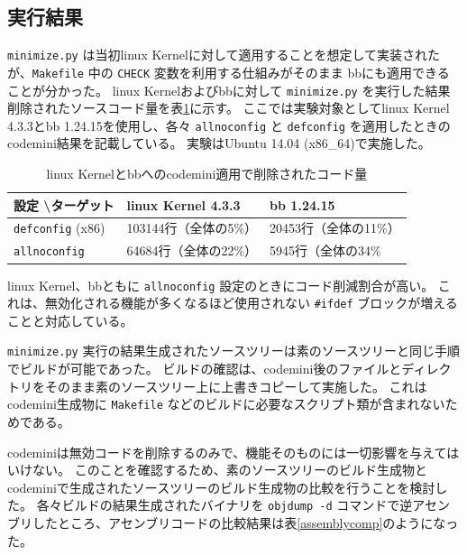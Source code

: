 \subsection{実行結果}
\verb|minimize.py| は当初\acrshort{linux} Kernelに対して適用することを想定して実装されたが、\verb|Makefile| 中の \verb|CHECK| 変数を利用する仕組みがそのまま
\acrshort{bb}にも適用できることが分かった。
\acrshort{linux} Kernelおよび\acrshort{bb}に対して \verb|minimize.py| を実行した結果削除されたソースコード量を表\ref{ministats}に示す。
ここでは実験対象として\acrshort{linux} Kernel 4.3.3と\acrshort{bb} 1.24.15を使用し、各々 \verb|allnoconfig| と \verb|defconfig| を適用したときの
\acrshort{codemini}結果を記載している。
実験はUbuntu 14.04 (x86\_64)で実施した。
\begin{table}[H]
  \caption{\acrshort{linux} Kernelと\acrshort{bb}への\acrshort{codemini}適用で削除されたコード量}
  \label{ministats}
  \centering
  \begin{tabular}{l|ll}
    設定 \textbackslash ターゲット & \acrshort{linux} Kernel 4.3.3 & \acrshort{bb} 1.24.15 \\
    \hline 
    \verb|defconfig| (x86) & 103144行（全体の5\%） & 20453行（全体の11\%）\\
    \verb|allnoconfig| & 64684行（全体の22\%） & 5945行（全体の34\%
  \end{tabular}
\end{table}
\par
\acrshort{linux} Kernel、\acrshort{bb}ともに \verb|allnoconfig| 設定のときにコード削減割合が高い。
これは、無効化される機能が多くなるほど使用されない \verb|#ifdef| ブロックが増えることと対応している。
\par
\verb|minimize.py| 実行の結果生成されたソースツリーは素のソースツリーと同じ手順でビルドが可能であった。
ビルドの確認は、\acrshort{codemini}後のファイルとディレクトリをそのまま素のソースツリー上に上書きコピーして実施した。
これは\acrshort{codemini}生成物に \verb|Makefile| などのビルドに必要なスクリプト類が含まれないためである。
\par
\acrshort{codemini}は無効コードを削除するのみで、機能そのものには一切影響を与えてはいけない。
このことを確認するため、素のソースツリーのビルド生成物と\acrshort{codemini}で生成されたソースツリーのビルド生成物の比較を行うことを検討した。
各々ビルドの結果生成されたバイナリを \verb|objdump -d| コマンドで逆アセンブリしたところ、アセンブリコードの比較結果は表\ref{assemblycomp}のようになった。
